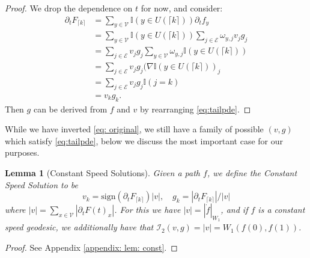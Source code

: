 \documentclass[conference]{IEEEtran}
\newcommand{\VV}{\mathcal{V}}
\newcommand{\EE}{\mathcal{E}}
\newcommand{\ceil}[1]{\lceil #1 \rceil}
\theoremstyle{ieeestyle}
\newtheorem{lem}{Lemma}
\begin{document}
\begin{proof}
    We drop the dependence on $t$ for now, and consider:
    \begin{align*}
        \partial_t F_{\ceil{k}} &=\sum_{y \in \VV} \mathbb{I}(y \in U(\ceil{k})) \partial_t f_y\\ &= \sum_{y \in \VV} \mathbb{I}(y \in U(\ceil{k}))\sum_{j \in \EE} \omega_{y,j}v_jg_j\\
        &= \sum_{j \in \EE}v_j g_j \sum_{y \in \VV} \omega_{y,j}\mathbb{I}(y \in U(\ceil{k})) \\
        &= \sum_{j \in \EE}v_jg_j (\nabla \mathbb{I}(y \in U(\ceil{k}))_j\\
        &= \sum_{j \in \EE} v_j g_j \mathbb{I}(j = k)\\
        &= v_kg_k.
    \end{align*}
    Then $g$ can be derived from $f$ and $v$ by rearranging \eqref{eq:tailpde}.
\end{proof}
While we have inverted \eqref{eq: original}, we still have a family of possible $(v,g)$ which satisfy \eqref{eq:tailpde}, below we discuss the most important case for our purposes.
\begin{lem}[Constant Speed Solutions]\label{lem: const}
    Given a path $f$, we define the \textit{Constant Speed Solution} to be
    \begin{equation}
        v_k = \text{sign}(\partial_t F_{\ceil{k}})|v|, \quad g_k = |\partial_t F_{\ceil{k}}|/|v|
    \end{equation}
     where $|v| = \sum_{x \in \VV} |\partial_t F(t)_x|$. For this we have $|v| = |\dot{f}|_{W_1}$, and if $f$ is a constant speed geodesic, we additionally have that $\mathcal{I}_2(v,g) = |v|= W_1(f(0),f(1))$.
\end{lem}
\begin{proof}
    See Appendix \ref{appendix: lem: const}.
\end{proof}
\end{document}
